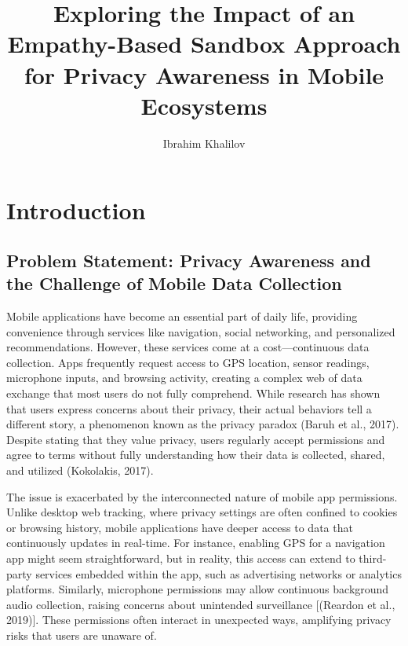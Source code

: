 \documentclass[acmlarge, nonacm]{acmart}
\begin{document}
\title{Exploring the Impact of an Empathy-Based Sandbox
Approach for Privacy Awareness in Mobile Ecosystems}

\author{Ibrahim Khalilov}


\renewcommand{\shortauthors}{Khalilov et al.}

\maketitle

\section{Introduction}

\subsection{Problem Statement: Privacy Awareness and the Challenge of Mobile Data Collection}

Mobile applications have become an essential part of daily life, providing convenience through services like navigation, social networking, and personalized recommendations. However, these services come at a cost—continuous data collection. Apps frequently request access to GPS location, sensor readings, microphone inputs, and browsing activity, creating a complex web of data exchange that most users do not fully comprehend. While research has shown that users express concerns about their privacy, their actual behaviors tell a different story, a phenomenon known as the privacy paradox (Baruh et al., 2017). Despite stating that they value privacy, users regularly accept permissions and agree to terms without fully understanding how their data is collected, shared, and utilized (Kokolakis, 2017).

The issue is exacerbated by the interconnected nature of mobile app permissions. Unlike desktop web tracking, where privacy settings are often confined to cookies or browsing history, mobile applications have deeper access to data that continuously updates in real-time. For instance, enabling GPS for a navigation app might seem straightforward, but in reality, this access can extend to third-party services embedded within the app, such as advertising networks or analytics platforms. Similarly, microphone permissions may allow continuous background audio collection, raising concerns about unintended surveillance [(Reardon et al., 2019)]. These permissions often interact in unexpected ways, amplifying privacy risks that users are unaware of.
\end{document}
